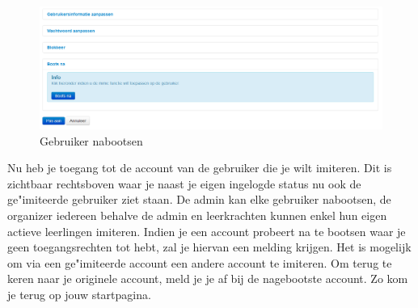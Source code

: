 \documentclass[]{article}
\begin{document}
\begin{figure}[!ht]
	\centering
	\includegraphics[width=1\textwidth]{img/mimic_user}
	\caption{Gebruiker nabootsen}
	\label{mimic_user}
\end{figure}

Nu heb je toegang tot de account van de gebruiker die je wilt imiteren. Dit is zichtbaar rechtsboven waar je naast je eigen ingelogde status nu ook de ge"imiteerde gebruiker ziet staan. De admin kan elke gebruiker nabootsen, de organizer iedereen behalve de admin en leerkrachten kunnen enkel hun eigen actieve leerlingen imiteren. Indien je een account probeert na te bootsen waar je geen toegangsrechten tot hebt, zal je hiervan een melding krijgen. Het is mogelijk om via een ge"imiteerde account een andere account te imiteren. Om terug te keren naar je originele account, meld je je af bij de nagebootste account. Zo kom je terug op jouw startpagina. 
\end{document}

